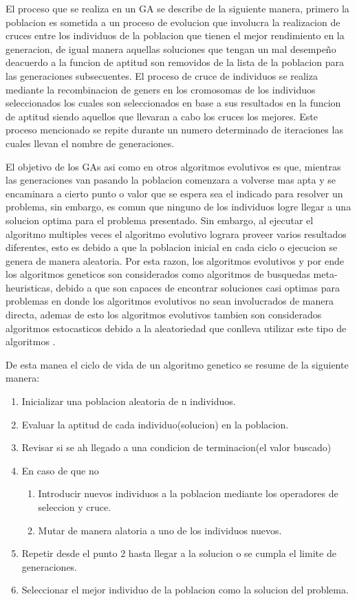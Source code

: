 El proceso que se realiza en un GA se describe de la siguiente manera, primero
la poblacion es sometida a un proceso de evolucion que involucra la realizacion
de cruces entre los individuos de la poblacion que tienen el mejor rendimiento
en la generacion, de igual manera aquellas soluciones que tengan un mal
desempeño deacuerdo a la funcion de aptitud son removidos de la lista de la
poblacion para las generaciones subsecuentes. El proceso de cruce de individuos
se realiza mediante la recombinacion de geners en los cromosomas de los
individuos seleccionados los cuales son seleccionados en base a sus resultados
en la funcion de aptitud siendo aquellos que llevaran a cabo los cruces los
mejores. Este proceso mencionado se repite durante un numero determinado de
iteraciones las cuales llevan el nombre de generaciones.

El objetivo de los GAs asi como en otros algoritmos evolutivos es que, mientras
las generaciones van pasando la poblacion comenzara a volverse mas apta y se
encaminara a cierto punto o valor que se espera sea el indicado para resolver un
problema, sin embargo, es comun que ninguno de los individuos logre llegar a una
solucion optima para el problema presentado. Sin embargo, al ejecutar el
algoritmo multiples veces el algoritmo evolutivo lograra proveer varios
resultados diferentes, esto es debido a que la poblacion inicial en cada ciclo o
ejecucion se genera de manera aleatoria. Por esta razon, los algoritmos
evolutivos y por ende los algoritmos geneticos son considerados como algoritmos
de busquedas meta-heuristicas, debido a que son capaces de encontrar soluciones
casi optimas para problemas en donde los algoritmos evolutivos no sean
involucrados de manera directa, ademas de esto los algoritmos evolutivos tambien
son considerados algoritmos estocasticos debido a la aleatoriedad que conlleva
utilizar este tipo de algoritmos \cite{Harik1999}.

De esta manea el ciclo de vida de un algoritmo genetico se resume de la
siguiente manera: 

\begin{enumerate}
    \item Inicializar una poblacion aleatoria de n individuos.
    \item Evaluar la aptitud de cada individuo(solucion) en la poblacion.
    \item Revisar si se ah llegado a una condicion de terminacion(el valor buscado)
    \item En caso de que no
    \begin{enumerate}
        \item Introducir nuevos individuos a la poblacion mediante los
        operadores de seleccion y cruce.
        \item Mutar de manera alatoria a uno de los individuos nuevos.
    \end{enumerate} 
    \item Repetir desde el punto 2 hasta llegar a la solucion o se cumpla el
    limite de generaciones.
    \item Seleccionar el mejor individuo de la poblacion como la solucion del problema.
\end{enumerate}

